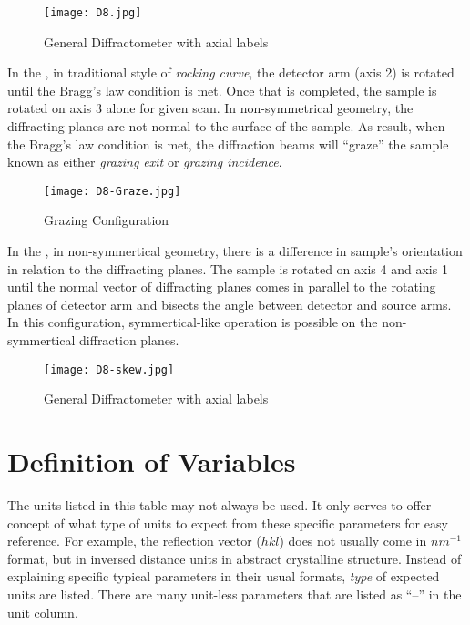 \begin{figure}[h]
\centering
\caption{General Diffractometer with axial labels}
\label{D8}
\texttt{[image: D8.jpg]}
\end{figure}

In the , in traditional style of \emph{rocking curve}, the detector arm (axis 2) is rotated until the Bragg's law condition is met.  Once that is completed, the sample is rotated on axis 3 alone for given scan.  In non-symmetrical geometry, the diffracting planes are not normal to the surface of the sample.  As result, when the Bragg's law condition is met, the diffraction beams will ``graze'' the sample known as either \emph{grazing exit} or \emph{grazing incidence}.


\begin{figure}[h]
\centering
\caption{Grazing Configuration}
\label{D8-Graze}
\texttt{[image: D8-Graze.jpg]}
\end{figure}

In the ,  in non-symmertical geometry, there is a difference in sample's orientation in relation to the diffracting planes.  The sample is rotated on axis 4 and axis 1 until the normal vector of diffracting planes comes in parallel to the rotating planes of detector arm and bisects the angle between detector and source arms.   In this configuration, symmertical-like operation is possible on the non-symmertical diffraction planes.

\begin{figure}[h]
\centering
\caption{General Diffractometer with axial labels}
\label{D8-skew}
\texttt{[image: D8-skew.jpg]}
\end{figure}




	\chapter{Definition of Variables}\label{DefVar}
The units listed in this table may not always be used.  It only serves to offer concept of what type of units to expect from these specific parameters for easy reference.  For example, the reflection vector ($hkl$) does not usually come in $nm^{-1}$ format, but in inversed distance units in abstract crystalline structure.  Instead of explaining specific typical parameters in their usual formats, \emph{type} of expected units are listed.  There are many unit-less parameters that are listed as ``--'' in the unit column.


